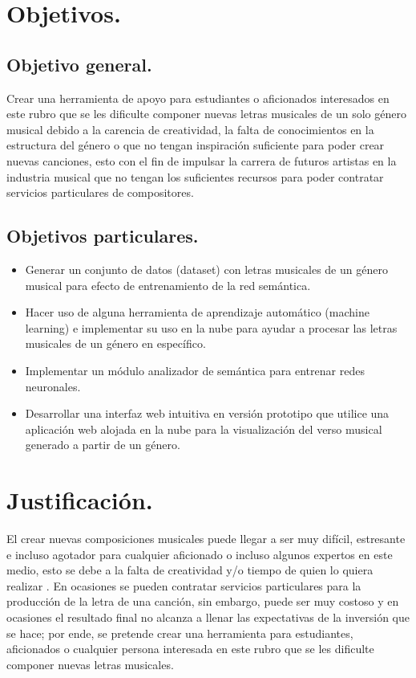 \documentclass[12pt, a4paper, titlepage]{report}
\begin{document}
\section{Objetivos.}
	\subsection{Objetivo general.}
	Crear una herramienta de apoyo para estudiantes o aficionados interesados en este rubro que se les dificulte componer nuevas letras musicales de un solo género musical debido a la carencia de creatividad, la falta de conocimientos en la estructura del género o que no tengan inspiración suficiente para poder crear nuevas canciones, esto con el fin de impulsar la carrera de futuros artistas en la industria musical que no tengan los suficientes recursos para poder contratar servicios particulares de compositores.
	
	\subsection{Objetivos particulares.}
		\begin{itemize}
			\item Generar un conjunto de datos (dataset) con letras musicales de un género musical para efecto de entrenamiento de la red semántica.
    		\item Hacer uso de alguna herramienta de aprendizaje automático (machine learning) e implementar su uso en la nube para ayudar a procesar las letras musicales de un género en específico.
    		\item Implementar un módulo analizador de semántica para entrenar redes neuronales.
    		\item Desarrollar una interfaz web intuitiva en versión prototipo que utilice una aplicación web alojada en la nube para la visualización del verso musical generado a partir de un género.
    	\end{itemize}
		
    	\section{Justificación.}
    	El crear nuevas composiciones musicales puede llegar a ser muy difícil, estresante e incluso agotador para cualquier aficionado o incluso algunos expertos en este medio, esto se debe a la falta de creatividad y/o tiempo de quien lo quiera realizar \cite{What_about_the_music}. En ocasiones se pueden contratar servicios particulares para la producción de la letra de una canción, sin embargo, puede ser muy costoso y en ocasiones el resultado final no alcanza a llenar las expectativas de la inversión que se hace; por ende, se pretende crear una herramienta para estudiantes, aficionados o cualquier persona interesada en este rubro que se les dificulte componer nuevas letras musicales.
    	
\end{document}
